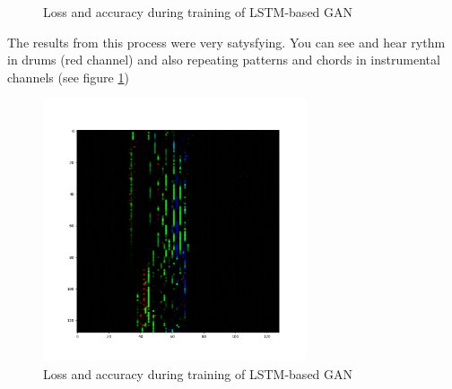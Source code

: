 \documentclass[]{article}
\begin{document}
\begin{figure}[!h]
	\centering
	\caption{Loss and accuracy during training of LSTM-based GAN}
\end{figure}

The results from this process were very satysfying. You can see and hear rythm in drums (red channel) and also repeating patterns and chords in instrumental channels (see figure \ref{fig:pianoroll-example})


\begin{figure}[h!]
	\centering
	\includegraphics[width=0.69\textwidth]{img/2021_01_31_22_56_39_pianoroll-DC-GAN_epoch_5900.png}
	\caption{Loss and accuracy during training of LSTM-based GAN}
	\label{fig:pianoroll-example}
\end{figure}
\end{document}
